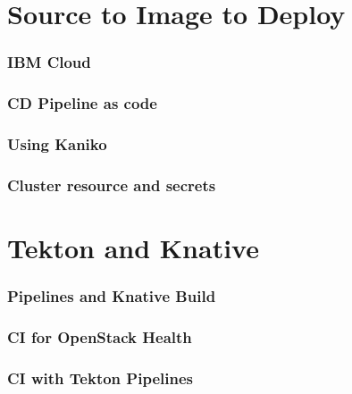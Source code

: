 \documentclass[aspectratio=169,11pt,hyperref={colorlinks=true}]{beamer}
\begin{document}
\begin{lblackrwhiteframe}
\begin{blackframe}
\section{Source to Image to Deploy}

\begin{grayframe}
  \frametitle{IBM Cloud}
\end{grayframe}

\begin{grayframe}
  \frametitle{CD Pipeline as code}
\end{grayframe}

\begin{grayframe}
  \frametitle{Using Kaniko}
\end{grayframe}

\begin{grayframe}
  \frametitle{Cluster resource and secrets}
\end{grayframe}

\section{Tekton and Knative}

\begin{grayframe}
  \frametitle{Pipelines and Knative Build}
\end{grayframe}

\begin{grayframe}
  \frametitle{CI for OpenStack Health}
\end{grayframe}

\begin{grayframe}
  \frametitle{CI with Tekton Pipelines}
\end{grayframe}


\end{blackframe}
\end{lblackrwhiteframe}
\end{document}
